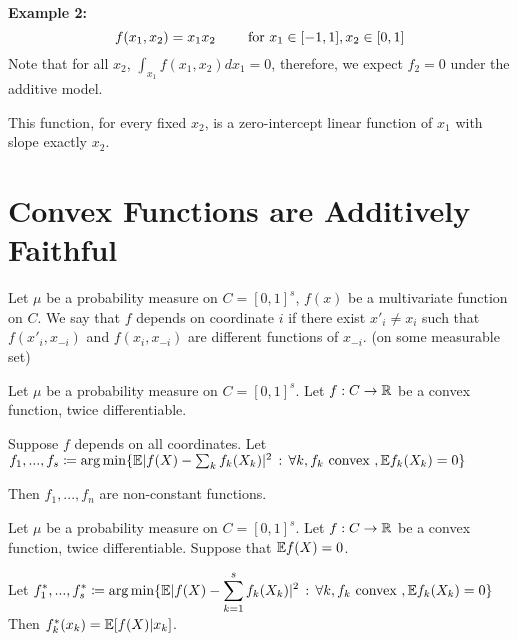 \documentclass{article}
\begin{document}
\textbf{Example 2:}
\[
f(x_1, x_2) = x_1 x_2 \qquad \textrm{ for } x_1 \in [-1,1], x_2 \in [0,1]
\]
Note that for all $x_2$, $\int_{x_1} f(x_1, x_2) d x_1 = 0$, therefore, we expect $f_2 = 0$ under the additive model.

This function, for every fixed $x_2$, is a zero-intercept linear function of $x_1$ with slope exactly $x_2$.

\section{Convex Functions are Additively Faithful}

Let $\mu$ be a probability measure on $C=[0,1]^s$, $f(x)$ be a multivariate function on $C$. We say that $f$ depends on coordinate $i$ if there exist $x'_i \neq x_i$ such that $f(x'_i, x_{-i})$ and $f(x_i, x_{-i})$ are different functions of $x_{-i}$. (on some measurable set)

\begin{theorem}
Let $\mu$ be a probability measure on $C=[0,1]^s$. Let $f: C \rightarrow \mathbb{R}$ be a convex function, twice differentiable.

Suppose $f$ depends on all coordinates. Let $f_1,...,f_s \coloneqq \arg\min \{ \mathbb{E} | f(X) - \sum_k f_k(X_k) |^2 \,:\, \forall k, f_k \textrm{ convex }, \mathbb{E} f_k(X_k) = 0\}$
 
 Then $f_1,...,f_n$ are non-constant functions.
 \end{theorem}

 
 \begin{lemma}
\label{lem:int_reduction}
Let $\mu$ be a probability measure on $C=[0,1]^s$. Let $f: C \rightarrow \mathbb{R}$ be a convex function, twice differentiable. Suppose that $\mathbb{E} f(X) = 0$.

Let $\displaystyle f^*_1,...,f^*_s \coloneqq \arg\min \{ \mathbb{E} | f(X) - \sum_{k=1}^s f_k(X_k) |^2 \,:\, \forall k, f_k \textrm{ convex }, \mathbb{E} f_k(X_k) = 0\}$ \\

Then $f^*_k(x_k) = \mathbb{E}[ f(X) | x_k]$.
\end{lemma}
 
\end{document}
